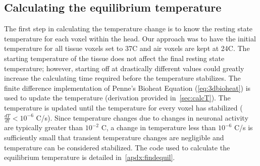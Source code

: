   
    \FloatBarrier
    \subsection{\label{sec:calcequilT} Calculating the equilibrium temperature}
  The first step in calculating the temperature change is to know the resting state temperature for each voxel within the head. Our approach was to have the initial temperature for all tissue voxels set to 37\degree C and air voxels are kept at 24\degree C.  The starting temperature of the tissue does not affect the final resting state temperature; however, starting off at drastically different values could greatly increase the calculating time required before the temperature stabilizes. The finite difference implementation of Penne's Bioheat Equation (\cref{eq:3dbioheat}) is used to update the temperature (derivation provided in~\cref{sec:calcT}).  The temperature is updated until the temperature for every voxel has stabilized ($\frac{dT}{dt} < 10^{-6}$ \degree C/s).  Since temperature changes due to changes in neuronal activity are typically greater than $10^{-2}$ \degree C, a change in temperature less than $10^{-6}$ \degree C/s is sufficiently small that transient temperature changes are negligible and temperature can be considered stabilized.  The code used to calculate the equilibrium temperature is detailed in~\cref{apdx:findequil}.
  

